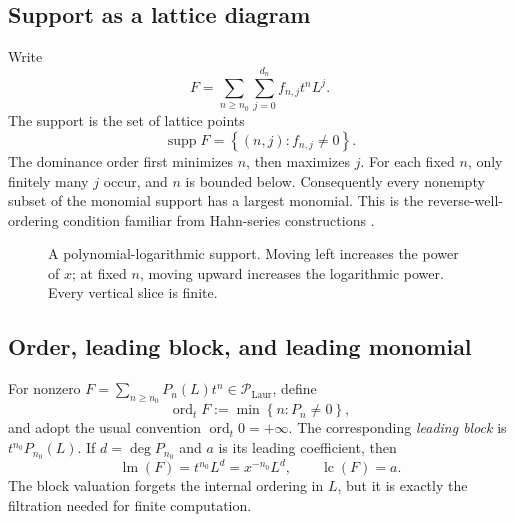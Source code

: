 \documentclass[11pt]{article}
\theoremstyle{pltheorem}
\newcommand{\PLL}{\mathscr P_{\mathrm{Laur}}}
\newcommand{\ordt}{\operatorname{ord}_t}
\newcommand{\supp}{\operatorname{supp}}
\newcommand{\lm}{\operatorname{lm}}
\newcommand{\lc}{\operatorname{lc}}
\newcommand{\set}[1]{\left\{#1\right\}}
\begin{document}
\subsection{Support as a lattice diagram}

Write
\begin{equation}\label{eq:double-coeff-form}
 F=\sum_{n\ge n_0}\sum_{j=0}^{d_n}f_{n,j}t^nL^j.
\end{equation}
The support is the set of lattice points
\[
 \supp F=\set{(n,j):f_{n,j}\ne0}.
\]
The dominance order first minimizes \(n\), then maximizes \(j\).  For each fixed \(n\), only finitely many \(j\) occur, and \(n\) is bounded below.  Consequently every nonempty subset of the monomial support has a largest monomial.  This is the reverse-well-ordering condition familiar from Hahn-series constructions \cite{hahn,edgar-beginners}.

\begin{figure}[htbp]
\centering
{}
\caption{A polynomial-logarithmic support.  Moving left increases the power of \(x\); at fixed \(n\), moving upward increases the logarithmic power.  Every vertical slice is finite.}
\label{fig:support-lattice}
\end{figure}

\subsection{Order, leading block, and leading monomial}

For nonzero \(F=\sum_{n\ge n_0}P_n(L)t^n\in\PLL\), define
\begin{equation}\label{eq:t-order}
 \ordt F:=\min\set{n:P_n\ne0},
\end{equation}
and adopt the usual convention \(\ordt 0=+\infty\).
The corresponding \emph{leading block} is \(t^{n_0}P_{n_0}(L)\).  If
\(d=\deg P_{n_0}\) and \(a\) is its leading coefficient, then
\begin{equation}\label{eq:leading-monomial}
 \lm(F)=t^{n_0}L^d=x^{-n_0}L^d,
 \qquad
 \lc(F)=a.
\end{equation}
The block valuation forgets the internal ordering in \(L\), but it is exactly the filtration needed for finite computation.
\end{document}

